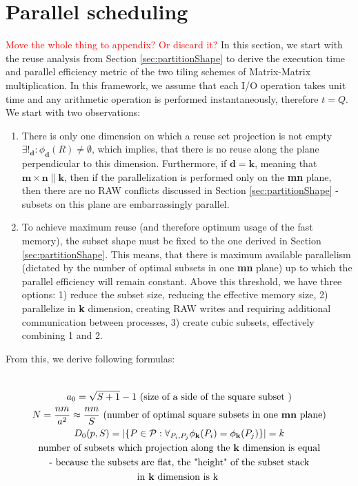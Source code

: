 \documentclass[sigconf]{acmart}
\newcommand\todo[1]{\textcolor{red}{#1}}
\begin{document}
\appendix
\section{Parallel scheduling}
\todo{Move the whole thing to appendix? Or discard it?}
In this section, we start with the reuse analysis from Section 
\ref{sec:partitionShape} 
to derive the execution time and parallel efficiency metric of the two tiling 
schemes of Matrix-Matrix multiplication. In this framework, we assume that each 
I/O operation takes unit time and any arithmetic operation is performed 
instantaneously, therefore $t = Q$. We start with two observations:

\begin{enumerate}
	\item There is only one dimension on 
	which a reuse set projection is not empty $\exists!_{\mathbf{d}}: 
	\phi_{\mathbf{d}}(R) \ne 
	\emptyset$, which implies, that there is no reuse along the plane 
	perpendicular 
	to this dimension. Furthermore, if $\mathbf{d} = \mathbf{k}$, meaning that 
	$\mathbf{m} \times \mathbf{n} \parallel \mathbf{k}$, then if the 
	parallelization is performed only on the \textbf{mn} plane, then there are 
	no RAW 
	conflicts discussed in Section \ref{sec:partitionShape} - subsets on 
	this 
	plane are embarrassingly parallel. 
	\item To achieve maximum reuse (and therefore optimum usage 
	of the fast memory), the subset shape must be fixed to the one derived 
	in 
	Section \ref{sec:partitionShape}. This means, that there is maximum 
	available 
	parallelism (dictated by the number of optimal subsets in one  
	\textbf{mn} plane) up to which the parallel efficiency will remain 
	constant. Above this threshold, we have three options: 1) reduce the 
	subset size, reducing the effective memory size, 2) parallelize in 
	\textbf{k} dimension, creating RAW writes and requiring additional 
	communication between processes, 3) create cubic subsets, effectively 
	combining 1 and 2.
\end{enumerate}

From this, we derive following formulas:

\begin{multline}
\\
a_0 = \sqrt{S+1} - 1   \text{ (size of a side of the square subset )}\\
N = \frac{nm}{a^2} \approx \frac{nm}{S}  \text{ (number of optimal square 
	subsets in one \textbf{mn} plane)}\\
D_0(p,S) = |\{P \in \mathcal{P} : \forall_{P_i, P_j} \phi_{\mathbf{k}}(P_i) = 
\phi_{\mathbf{k}}(P_j)\}| = k \\
\text{number of subsets which projection along the \textbf{k} dimension is 
	equal} \\ 
\text{- because the subsets are flat, the "height" of the 
	subset stack}
\\ 
\text{in \textbf{k} dimension is k }\\
\end{multline}
\end{document}
